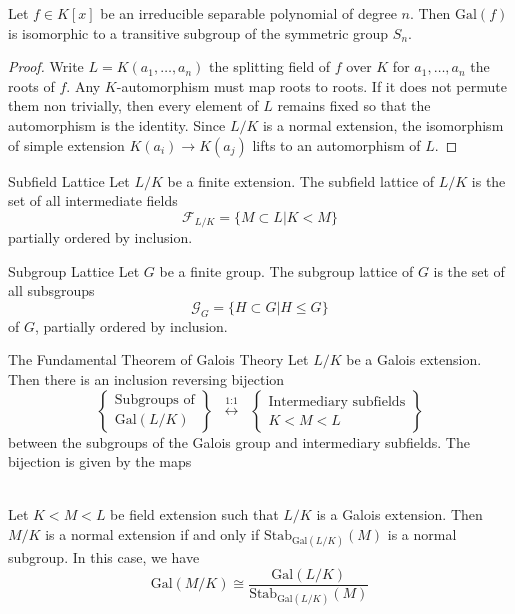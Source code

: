 \documentclass[a4paper]{article}
\begin{document}
\begin{lmm}{}{} Let $f\in K[x]$ be an irreducible separable polynomial of degree $n$. Then $\text{Gal}(f)$ is isomorphic to a transitive subgroup of the symmetric group $S_n$. \tcbline
\begin{proof}
Write $L=K(a_1,\dots,a_n)$ the splitting field of $f$ over $K$ for $a_1,\dots,a_n$ the roots of $f$. Any $K$-automorphism must map roots to roots. If it does not permute them non trivially, then every element of $L$ remains fixed so that the automorphism is the identity. Since $L/K$ is a normal extension, the isomorphism of simple extension $K(a_i)\to K(a_j)$ lifts to an automorphism of $L$. 
\end{proof}
\end{lmm}

\begin{defn}{Subfield Lattice}{} Let $L/K$ be a finite extension. The subfield lattice of $L/K$ is the set of all intermediate fields $$\mathcal{F}_{L/K}=\{M\subset L|K<M\}$$ partially ordered by inclusion. 
\end{defn}

\begin{defn}{Subgroup Lattice}{} Let $G$ be a finite group. The subgroup lattice of $G$ is the set of all subsgroups $$\mathcal{G}_G=\{H\subset G|H\leq G\}$$ of $G$, partially ordered by inclusion. 
\end{defn}

\begin{thm}{The Fundamental Theorem of Galois Theory}{} Let $L/K$ be a Galois extension. Then there is an inclusion reversing bijection $$\left\{\substack{\text{Subgroups of}\\\text{Gal}(L/K)}\right\}\;\;\overset{\text{1:1}}{\longleftrightarrow}\;\;\left\{\substack{\text{Intermediary subfields}\\ K<M<L}\right\}$$ between the subgroups of the Galois group and intermediary subfields. The bijection is given by the maps \\~\\
\end{thm}

\begin{thm}{}{} Let $K<M<L$ be field extension such that $L/K$ is a Galois extension. Then $M/K$ is a normal extension if and only if $\text{Stab}_{\text{Gal}(L/K)}(M)$ is a normal subgroup. In this case, we have $$\text{Gal}(M/K)\cong\frac{\text{Gal}(L/K)}{\text{Stab}_{\text{Gal}(L/K)}(M)}$$
\end{thm}
\end{document}
